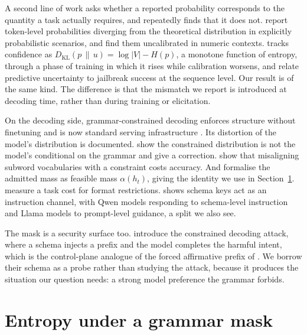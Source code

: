 \documentclass[11pt]{article}
\begin{document}
A second line of work asks whether a reported probability corresponds to the
quantity a task actually requires, and repeatedly finds that it does not.
\citet{toney-wails-2025-certain} report token-level probabilities diverging from
the theoretical distribution in explicitly probabilistic scenarios, and
\citet{lovering-etal-2025-language} find them uncalibrated in numeric contexts.
\citet{durai-2025-phases} tracks confidence as
$D_{\mathrm{KL}}(p \,\|\, u) = \log|V| - H(p)$, a monotone function of entropy,
through a phase of training in which it rises while calibration worsens, and
\citet{steindl-etal-2024-linguistic} relate predictive uncertainty to jailbreak
success at the sequence level. Our result is of the same kind. The difference is
that the mismatch we report is introduced at decoding time, rather than during
training or elicitation.

On the decoding side, grammar-constrained decoding enforces structure without
finetuning \citep{geng-etal-2023-grammar} and is now standard serving
infrastructure \citep{willard-louf-2023-efficient,dong-etal-2024-xgrammar}. Its
distortion of the model's distribution is documented.
\citet{park-etal-2024-grammar} show the constrained distribution is not the
model's conditional on the grammar and give a correction.
\citet{beurer-kellner-etal-2024-guiding} show that misaligning subword
vocabularies with a constraint costs accuracy. And
\citet{reddy-etal-2026-dccd} formalise the admitted mass as feasible mass
$\alpha(h_t)$, giving the identity we use in Section~\ref{sec:mechanism}.
\citet{tam-etal-2024-speak} measure a task cost for format restrictions.
\citet{le-2026-schema} shows schema keys act as an instruction channel, with Qwen
models responding to schema-level instruction and Llama models to prompt-level
guidance, a split we also see.

The mask is a security surface too. \citet{zhang-etal-2026-grammar} introduce the
constrained decoding attack, where a schema injects a prefix and the model
completes the harmful intent, which is the control-plane analogue of the forced
affirmative prefix of \citet{wei-etal-2023-jailbroken}. We borrow their schema as
a probe rather than studying the attack, because it produces the situation our
question needs: a strong model preference the grammar forbids.

\section{Entropy under a grammar mask}
\label{sec:mechanism}
\end{document}
